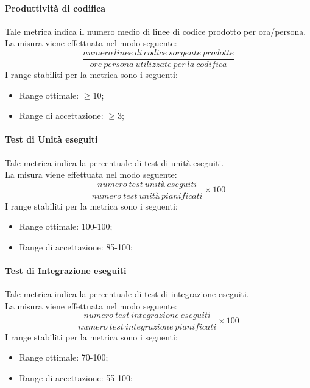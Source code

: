 			\paragraph{Produttività di codifica}
			Tale metrica indica il numero medio di linee di codice prodotto per ora/persona.
			\\La misura viene effettuata nel modo seguente:
				\begin{equation}
					\frac{numero~linee~di~codice~sorgente~prodotte}{ore~persona~utilizzate~per~la~codifica}
				\end{equation}
			I range stabiliti per la metrica sono i seguenti:
			\begin{itemize}
					\item Range ottimale: $\geq{10}$;
					\item Range di accettazione: $\geq{3}$;
				\end{itemize}
				
			\paragraph{Test di Unità eseguiti}
			Tale metrica indica la percentuale di test di unità eseguiti.
			\\La misura viene effettuata nel modo seguente:
				\begin{equation}
					\frac{numero~test~unità~eseguiti}{numero~test~unità~pianificati}\times100
				\end{equation}
			I range stabiliti per la metrica sono i seguenti:
			\begin{itemize}
					\item Range ottimale: 100-100;
					\item Range di accettazione: 85-100;
				\end{itemize}
				
			\paragraph{Test di Integrazione eseguiti}
				Tale metrica indica la percentuale di test di integrazione eseguiti.
			\\La misura viene effettuata nel modo seguente:
				\begin{equation}
					\frac{numero~test~integrazione~eseguiti}{numero~test~integrazione~pianificati}\times100
				\end{equation}
			I range stabiliti per la metrica sono i seguenti:
				\begin{itemize}
					\item Range ottimale: 70-100;
					\item Range di accettazione: 55-100;
				\end{itemize}
				
